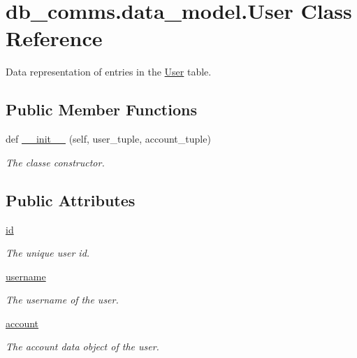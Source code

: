 \hypertarget{classdb__comms_1_1data__model_1_1_user}{}\section{db\+\_\+comms.\+data\+\_\+model.\+User Class Reference}
\label{classdb__comms_1_1data__model_1_1_user}


Data representation of entries in the \hyperlink{classdb__comms_1_1data__model_1_1_user}{User} table.  


\subsection*{Public Member Functions}
\begin{DoxyCompactItemize}
\item 
def \hyperlink{classdb__comms_1_1data__model_1_1_user_a54a59bc5f3a7ac8b74ef7ed32d411f21}{\+\_\+\+\_\+init\+\_\+\+\_\+} (self, user\+\_\+tuple, account\+\_\+tuple)
\begin{DoxyCompactList}\small\item\em The classe constructor. \end{DoxyCompactList}\end{DoxyCompactItemize}
\subsection*{Public Attributes}
\begin{DoxyCompactItemize}
\item 
\hyperlink{classdb__comms_1_1data__model_1_1_user_a9616c67d1c09b22eafb5e8f585bc955f}{id}
\begin{DoxyCompactList}\small\item\em The unique user id. \end{DoxyCompactList}\item 
\hyperlink{classdb__comms_1_1data__model_1_1_user_a1e0ac95a2b164936f0754bff42f8d315}{username}
\begin{DoxyCompactList}\small\item\em The username of the user. \end{DoxyCompactList}\item 
\hyperlink{classdb__comms_1_1data__model_1_1_user_a3f66468667b974cc58e40bccd940d593}{account}
\begin{DoxyCompactList}\small\item\em The account data object of the user. \end{DoxyCompactList}\end{DoxyCompactItemize}


